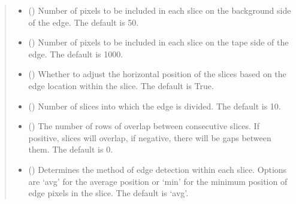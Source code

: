 \documentclass[letterpaper,10pt,english]{sphinxmanual}
\begin{document}
\begin{fulllineitems}
\begin{fulllineitems}
\begin{quote}
\begin{description}
\begin{itemize}
\item {} 
\sphinxAtStartPar
{} (\sphinxstyleliteralemphasis{\sphinxupquote{, }}) \textendash{} Number of pixels to be included in each slice on the background side of the edge. The default is 50.

\item {} 
\sphinxAtStartPar
{} (\sphinxstyleliteralemphasis{\sphinxupquote{, }}) \textendash{} Number of pixels to be included in each slice on the tape side of the edge. The default is 1000.

\item {} 
\sphinxAtStartPar
{} (\sphinxstyleliteralemphasis{\sphinxupquote{, }}) \textendash{} Whether to adjust the horizontal position of the slices based on the edge location within the slice.
The default is True.

\item {} 
\sphinxAtStartPar
{} (\sphinxstyleliteralemphasis{\sphinxupquote{, }}) \textendash{} Number of slices into which the edge is divided. The default is 10.

\item {} 
\sphinxAtStartPar
{} (\sphinxstyleliteralemphasis{\sphinxupquote{, }}) \textendash{} The number of rows of overlap between consecutive slices. If positive, slices will overlap, if negative,
there will be gaps between them. The default is 0.

\item {} 
\sphinxAtStartPar
{} (\sphinxstyleliteralemphasis{\sphinxupquote{, }}) \textendash{} Determines the method of edge detection within each slice. Options are ‘avg’ for the average position
or ‘min’ for the minimum position of edge pixels in the slice. The default is ‘avg’.


\end{itemize}
\end{description}
\end{quote}
\end{fulllineitems}
\end{fulllineitems}
\end{document}
